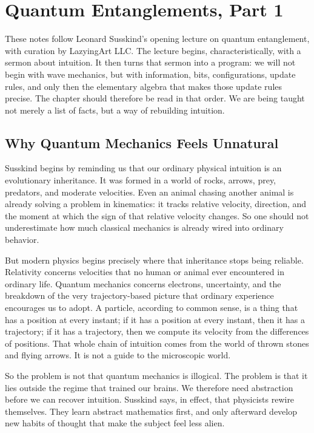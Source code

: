 \chapter{Quantum Entanglements, Part 1}

These notes follow Leonard Susskind's opening lecture on quantum entanglement, with curation by LazyingArt LLC. The lecture begins, characteristically, with a sermon about intuition. It then turns that sermon into a program: we will not begin with wave mechanics, but with information, bits, configurations, update rules, and only then the elementary algebra that makes those update rules precise. The chapter should therefore be read in that order. We are being taught not merely a list of facts, but a way of rebuilding intuition.

\section{Why Quantum Mechanics Feels Unnatural}

Susskind begins by reminding us that our ordinary physical intuition is an evolutionary inheritance. It was formed in a world of rocks, arrows, prey, predators, and moderate velocities. Even an animal chasing another animal is already solving a problem in kinematics: it tracks relative velocity, direction, and the moment at which the sign of that relative velocity changes. So one should not underestimate how much classical mechanics is already wired into ordinary behavior.

But modern physics begins precisely where that inheritance stops being reliable. Relativity concerns velocities that no human or animal ever encountered in ordinary life. Quantum mechanics concerns electrons, uncertainty, and the breakdown of the very trajectory-based picture that ordinary experience encourages us to adopt. A particle, according to common sense, is a thing that has a position at every instant; if it has a position at every instant, then it has a trajectory; if it has a trajectory, then we compute its velocity from the differences of positions. That whole chain of intuition comes from the world of thrown stones and flying arrows. It is not a guide to the microscopic world.

So the problem is not that quantum mechanics is illogical. The problem is that it lies outside the regime that trained our brains. We therefore need abstraction before we can recover intuition. Susskind says, in effect, that physicists rewire themselves. They learn abstract mathematics first, and only afterward develop new habits of thought that make the subject feel less alien.

